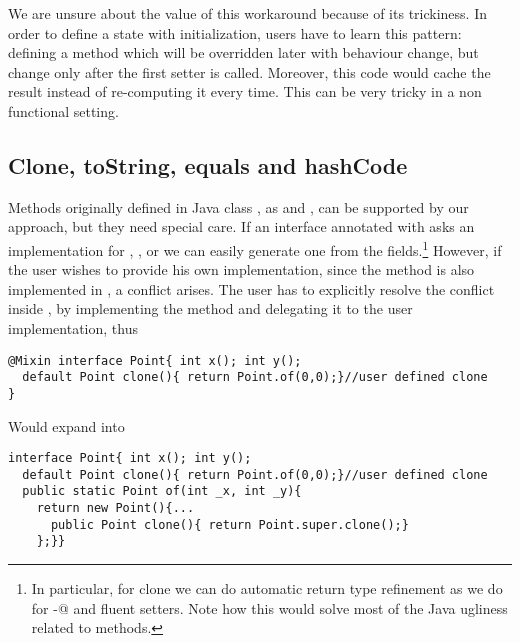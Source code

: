 We are unsure about the value of this workaround because of its trickiness. In
order to define a state with initialization, users have to learn this pattern:
defining a method which will be overridden later with behaviour change, but
change only after the first setter is called. Moreover, this code would cache
the result instead of re-computing it every time. This can be very tricky in a
non functional setting.

\begin{comment}
\subsection{Class Invariants in ClassLess Java}
Since objects are created by automatically generated methods, another limitation
of our current approach is that there is no place where the user can dynamically
check for class invariants. In Java often we see code like
\begin{lstlisting}
class Point{ int x; int y;
  Point(int x; int y){this.x=x;this.y=y; assert this.checkInvariant();}
  private boolean checkInvariant(){... x>0,y>0...}
}
\end{lstlisting} 

We are considering an extension of our annotation where 
default methods with the special name \Q@checkInvariant()@ will be called inside the \Q@of@ methods.
If multiple interfaces are implemented, and more then one offers
\Q@checkInvariant()@,  a composed implementation could be automatically generated, composing by \Q@&&@ the various competing implementations.
\end{comment}

\subsection{Clone, toString, equals and hashCode}

Methods originally defined in Java class \Q@Object@, as \Q@clone@ and
\Q@toString@, can be supported by our approach, but they need special
care. If an interface annotated with \mixin asks an implementation for
\Q@clone@, \Q@toString@, \Q@equals@ or \Q@hashCode@ we can easily
generate one from the fields.\footnote{In particular, for clone we can
  do automatic return type refinement as we do for \Q@with-@ and
  fluent setters. Note how this would solve most of the Java ugliness
  related to \Q@clone@ methods.}
However, if the user wishes to provide his own implementation, since the method is
also implemented in \Q@Object@, a conflict arises. The user has to
explicitly resolve the conflict inside \Q@of@, by implementing the method and
delegating it to the user implementation, thus
\begin{lstlisting}
@Mixin interface Point{ int x(); int y();
  default Point clone(){ return Point.of(0,0);}//user defined clone
}
\end{lstlisting} 
Would expand into 

\begin{lstlisting}
interface Point{ int x(); int y();
  default Point clone(){ return Point.of(0,0);}//user defined clone
  public static Point of(int _x, int _y){
    return new Point(){...
      public Point clone(){ return Point.super.clone();}
    };}}
\end{lstlisting} 

